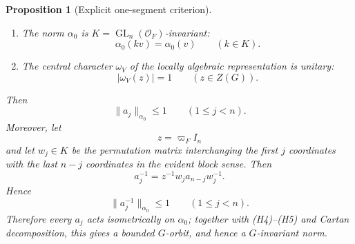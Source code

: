 \documentclass[12pt]{article}
\newtheorem{proposition}[theorem]{Proposition}
\theoremstyle{definition}
\theoremstyle{remark}
\DeclareMathOperator{\GL}{GL}
\begin{document}
\begin{proposition}[Explicit one-segment criterion]
\begin{enumerate}
 \item[\textup{(H4)}] The norm \(\alpha_0\) is \(K=\GL_n(\mathcal O_F)\)-invariant:
 \begin{equation}\label{eq:one-segment-criterion-K}
  \alpha_0(kv)=\alpha_0(v)
  \qquad(k\in K).
 \end{equation}

 \item[\textup{(H5)}] The central character \(\omega_V\) of the locally
 algebraic representation is unitary:
 \begin{equation}\label{eq:one-segment-criterion-centre}
  |\omega_V(z)|=1
  \qquad(z\in Z(G)).
 \end{equation}
\end{enumerate}

Then
\begin{equation}\label{eq:one-segment-positive-nonexpanding}
 \|a_j\|_{\alpha_0}\leq1
 \qquad(1\leq j<n).
\end{equation}
Moreover, let
\[
 z=\varpi_F I_n
\]
and let \(w_j\in K\) be the permutation matrix interchanging the first
\(j\) coordinates with the last \(n-j\) coordinates in the evident block
sense.  Then
\begin{equation}\label{eq:one-segment-inverse-explicit}
 a_j^{-1}
 =
 z^{-1}w_j a_{n-j}w_j^{-1}.
\end{equation}
Hence
\begin{equation}\label{eq:one-segment-negative-nonexpanding}
 \|a_j^{-1}\|_{\alpha_0}\leq1
 \qquad(1\leq j<n).
\end{equation}
Therefore every \(a_j\) acts isometrically on \(\alpha_0\); together with
\textup{(H4)}--\textup{(H5)} and Cartan decomposition, this gives a bounded
\(G\)-orbit, and hence a \(G\)-invariant norm.
\end{proposition}
\end{document}
